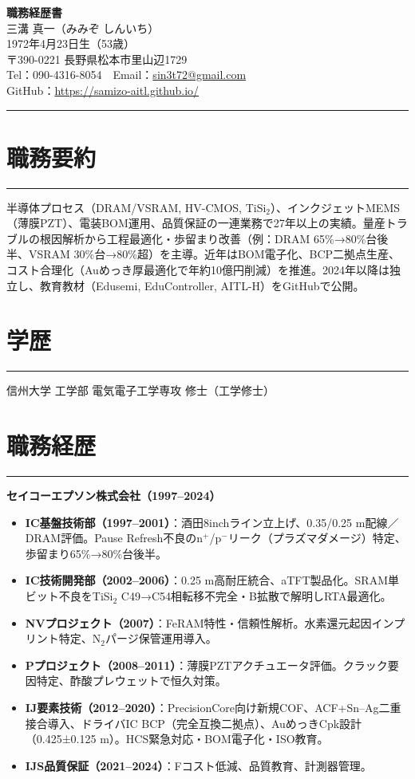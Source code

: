 \documentclass[11pt]{bxjsarticle}
\newcommand{\cvsection}[1]{\section*{#1}\vspace{-0.3em}\hrule\vspace{0.5em}}
\begin{document}
\begin{center}
{\Huge \textbf{職務経歴書}} \\[1.2em]
{\Large 三溝 真一（みみぞ しんいち）} \\[0.5em]
1972年4月23日生（53歳） \\[0.3em]
〒390-0221 長野県松本市里山辺1729 \\[0.3em]
Tel：090-4316-8054　Email：\href{mailto:sin3t72@gmail.com}{sin3t72@gmail.com} \\[0.3em]
GitHub：\href{https://samizo-aitl.github.io/}{https://samizo-aitl.github.io/}
\end{center}

\vspace{1em}
\hrule
\vspace{1em}

\cvsection{職務要約}
半導体プロセス（DRAM/VSRAM, HV-CMOS, TiSi$_2$）、インクジェットMEMS（薄膜PZT）、電装BOM運用、品質保証の一連業務で27年以上の実績。量産トラブルの根因解析から工程最適化・歩留まり改善（例：DRAM 65\%→80\%台後半、VSRAM 30\%台→80\%超）を主導。近年はBOM電子化、BCP二拠点生産、コスト合理化（Auめっき厚最適化で年約10億円削減）を推進。2024年以降は独立し、教育教材（Edusemi, EduController, AITL-H）をGitHubで公開。

\cvsection{学歴}
信州大学 工学部 電気電子工学専攻 修士（工学修士）

\cvsection{職務経歴}
\textbf{セイコーエプソン株式会社（1997–2024）}

\begin{itemize}
  \item \textbf{IC基盤技術部（1997–2001）}：酒田8inchライン立上げ、0.35/0.25 \textmu m配線／DRAM評価。Pause Refresh不良のn$^+$/p$^-$リーク（プラズマダメージ）特定、歩留まり65\%→80\%台後半。
  \item \textbf{IC技術開発部（2002–2006）}：0.25 \textmu m高耐圧統合、aTFT製品化。SRAM単ビット不良をTiSi$_2$ C49→C54相転移不完全・B拡散で解明しRTA最適化。
  \item \textbf{NVプロジェクト（2007）}：FeRAM特性・信頼性解析。水素還元起因インプリント特定、N$_2$パージ保管運用導入。
  \item \textbf{Pプロジェクト（2008–2011）}：薄膜PZTアクチュエータ評価。クラック要因特定、酢酸プレウェットで恒久対策。
  \item \textbf{IJ要素技術（2012–2020）}：PrecisionCore向け新規COF、ACF+Sn–Ag二重接合導入、ドライバIC BCP（完全互換二拠点）、AuめっきCpk設計（0.425±0.125 \textmu m）。HCS緊急対応・BOM電子化・ISO教育。
  \item \textbf{IJS品質保証（2021–2024）}：Fコスト低減、品質教育、計測器管理。
\end{itemize}
\end{document}
